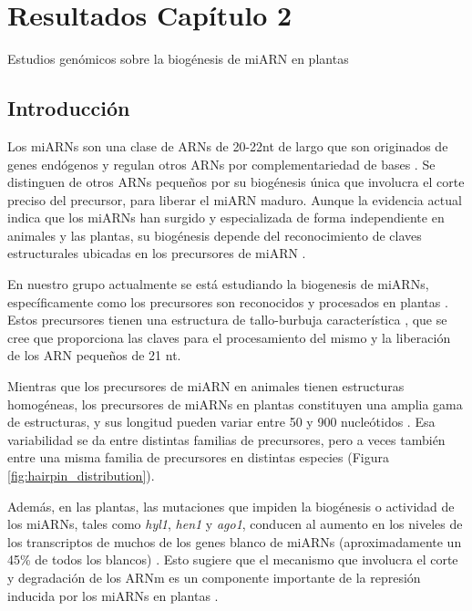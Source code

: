 
\chapter{Resultados Capítulo 2} 
{\LARGE Estudios genómicos sobre la biogénesis de miARN en plantas}

\graphicspath{{Chapter2/Figs/}}

\section{Introducción}
Los miARNs son una clase de ARNs de 20-22nt de largo que son originados de genes endógenos y regulan otros ARNs por complementariedad de bases \citep{Voinnet2009669}.
Se distinguen de otros ARNs pequeños por su biogénesis única que involucra el corte preciso del precursor, para liberar el miARN maduro.
Aunque la evidencia actual indica que los miARNs han surgido y especializada de forma independiente en animales y las plantas, su biogénesis depende del reconocimiento de claves estructurales ubicadas en los precursores de miARN \citep{pmid21554756,citeulike:8816489,Bologna11112012}.

En nuestro grupo actualmente se está estudiando la biogenesis de miARNs, específicamente como los precursores son reconocidos y procesados en plantas \citep{Bologna2013}.
Estos precursores tienen una estructura de tallo-burbuja característica \citep{Jones-Rhoades2006}, que se cree que proporciona las claves para el procesamiento del mismo y la liberación de los ARN pequeños de 21 nt.

Mientras que los precursores de miARN en animales tienen estructuras homogéneas, los precursores de miARNs en plantas constituyen una amplia gama de estructuras, y sus longitud pueden variar entre 50 y 900 nucleótidos \citep{Bologna2013,citeulike:8816489}.
Esa variabilidad se da entre distintas familias de precursores, pero a veces también entre una misma familia de precursores en distintas especies (Figura \ref{fig:hairpin_distribution}).

Además, en las plantas, las mutaciones que impiden la biogénesis o actividad de los miARNs, tales como \textit{hyl1}, \textit{hen1} y \textit{ago1}, conducen al aumento en los niveles de los transcriptos de muchos de los genes blanco de miARNs (aproximadamente un 45\% de todos los blancos) \citep{Han2004,pmid12747833,pmid16889646,Allen2005207}.
Esto sugiere que el mecanismo que involucra el corte y degradación de los ARNm es un componente importante de la represión inducida por los miARNs en plantas \citep{Jones-Rhoades2006, Voinnet2009669}.

